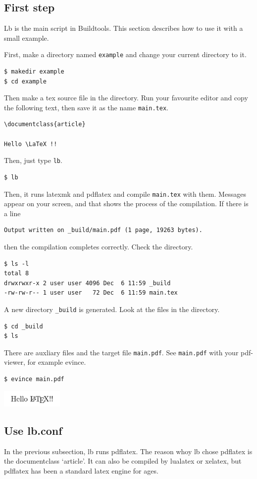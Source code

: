 \subsection{First step}
Lb is the main script in Buildtools.
This section describes how to use it with a small example.

First, make a directory named \verb|example| and change your current directory to it.
\begin{verbatim}
$ makedir example
$ cd example
\end{verbatim}

Then make a tex source file in the directory.
Run your favourite editor and copy the following text, then save it as the name \verb|main.tex|.
\begin{verbatim}
\documentclass{article}

Hello \LaTeX !!

\end{verbatim}

Then, just type \verb|lb|.
\begin{verbatim}
$ lb
\end{verbatim}
Then, it runs latexmk and pdflatex and compile \verb|main.tex| with them.
Messages appear on your screen, and that shows the process of the compilation.
If there is a line 
\begin{verbatim}
Output written on _build/main.pdf (1 page, 19263 bytes).
\end{verbatim}
then the compilation completes correctly.
Check the directory.
\begin{verbatim}
$ ls -l
total 8
drwxrwxr-x 2 user user 4096 Dec  6 11:59 _build
-rw-rw-r-- 1 user user   72 Dec  6 11:59 main.tex
\end{verbatim}
A new directory \verb|_build| is generated.
Look at the files in the directory.
\begin{verbatim}
$ cd _build
$ ls
\end{verbatim}
There are auxliary files and the target file \verb|main.pdf|.
See \verb|main.pdf| with your pdf-viewer, for example evince.
\begin{verbatim}
$ evince main.pdf
\end{verbatim}
\begin{center}
\includegraphics[width=3cm]{hellolatex.png}
\end{center}

\subsection{Use lb.conf}
In the previous subsection, lb runs pdflatex.
The reason whoy lb chose pdflatex is the documentclass `article'.
It can also be compiled by lualatex or xelatex, but pdflatex has been a standard latex engine for ages.

